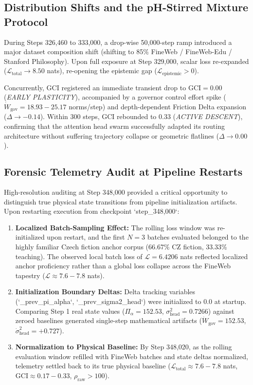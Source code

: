 \documentclass[11pt,twocolumn]{article}
\begin{document}
\subsection{Distribution Shifts and the pH-Stirred Mixture Protocol}
During Steps 326,460 to 333,000, a drop-wise 50,000-step ramp introduced a major dataset composition shift (shifting to 85\% FineWeb / FineWeb-Edu / Stanford Philosophy). Upon full exposure at Step 329,000, scalar loss re-expanded ($\mathcal{L}_{\text{total}} \to 8.50$ nats), re-opening the epistemic gap ($\mathcal{L}_{\text{epistemic}} > 0$).

Concurrently, GCI registered an immediate transient drop to $\text{GCI} = 0.00$ (\textit{EARLY PLASTICITY}), accompanied by a governor control effort spike ($\dot{W}_{\text{gov}} = 18.93 - 25.17$ norms/step) and depth-dependent Friction Delta expansion ($\Delta \to -0.14$). Within 300 steps, GCI rebounded to $0.33$ (\textit{ACTIVE DESCENT}), confirming that the attention head swarm successfully adapted its routing architecture without suffering trajectory collapse or geometric flatlines ($\Delta \to 0.00$).

\subsection{Forensic Telemetry Audit at Pipeline Restarts}
High-resolution auditing at Step 348,000 provided a critical opportunity to distinguish true physical state transitions from pipeline initialization artifacts. Upon restarting execution from checkpoint `step_348,000`:
\begin{enumerate}
    \item \textbf{Localized Batch-Sampling Effect:} The rolling loss window was re-initialized upon restart, and the first $N=3$ batches evaluated belonged to the highly familiar Czech fiction anchor corpus (66.67\% CZ fiction, 33.33\% teaching). The observed local batch loss of $\mathcal{L} = 6.4206$ nats reflected localized anchor proficiency rather than a global loss collapse across the FineWeb tapestry ($\mathcal{L} \approx 7.6 - 7.8$ nats).
    \item \textbf{Initialization Boundary Deltas:} Delta tracking variables (`_prev_pi_alpha`, `_prev_sigma2_head`) were initialized to $0.0$ at startup. Comparing Step 1 real state values ($\Pi_\alpha = 152.53$, $\sigma^2_{\text{head}} = 0.7266$) against zeroed baselines generated single-step mathematical artifacts ($\dot{W}_{\text{gov}} = 152.53$, $\dot{\sigma}^2_{\text{head}} = +0.727$).
    \item \textbf{Normalization to Physical Baseline:} By Step 348,020, as the rolling evaluation window refilled with FineWeb batches and state deltas normalized, telemetry settled back to its true physical baseline ($\mathcal{L}_{\text{total}} \approx 7.6 - 7.8$ nats, $\text{GCI} \approx 0.17 - 0.33$, $\rho_{\text{raw}} > 100$).
\end{enumerate}
\end{document}
